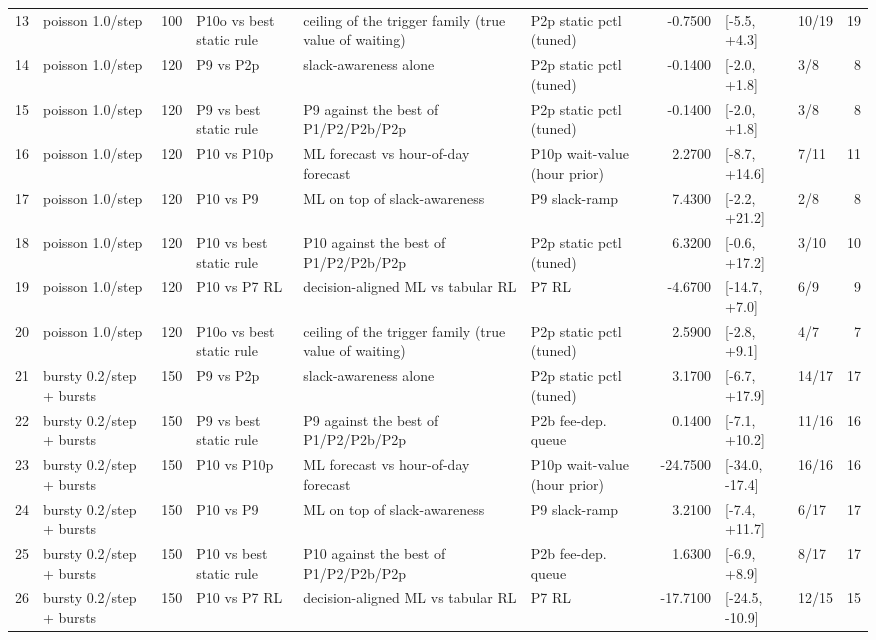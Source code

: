 \begin{tabular}{llrlllrllr}
13 & poisson 1.0/step & 100 & P10o vs best static rule & ceiling of the trigger family (true value of waiting) & P2p static pctl (tuned) & -0.7500 & [-5.5, +4.3] & 10/19 & 19 \\
14 & poisson 1.0/step & 120 & P9 vs P2p & slack-awareness alone & P2p static pctl (tuned) & -0.1400 & [-2.0, +1.8] & 3/8 & 8 \\
15 & poisson 1.0/step & 120 & P9 vs best static rule & P9 against the best of P1/P2/P2b/P2p & P2p static pctl (tuned) & -0.1400 & [-2.0, +1.8] & 3/8 & 8 \\
16 & poisson 1.0/step & 120 & P10 vs P10p & ML forecast vs hour-of-day forecast & P10p wait-value (hour prior) & 2.2700 & [-8.7, +14.6] & 7/11 & 11 \\
17 & poisson 1.0/step & 120 & P10 vs P9 & ML on top of slack-awareness & P9 slack-ramp & 7.4300 & [-2.2, +21.2] & 2/8 & 8 \\
18 & poisson 1.0/step & 120 & P10 vs best static rule & P10 against the best of P1/P2/P2b/P2p & P2p static pctl (tuned) & 6.3200 & [-0.6, +17.2] & 3/10 & 10 \\
19 & poisson 1.0/step & 120 & P10 vs P7 RL & decision-aligned ML vs tabular RL & P7 RL & -4.6700 & [-14.7, +7.0] & 6/9 & 9 \\
20 & poisson 1.0/step & 120 & P10o vs best static rule & ceiling of the trigger family (true value of waiting) & P2p static pctl (tuned) & 2.5900 & [-2.8, +9.1] & 4/7 & 7 \\
21 & bursty 0.2/step + bursts & 150 & P9 vs P2p & slack-awareness alone & P2p static pctl (tuned) & 3.1700 & [-6.7, +17.9] & 14/17 & 17 \\
22 & bursty 0.2/step + bursts & 150 & P9 vs best static rule & P9 against the best of P1/P2/P2b/P2p & P2b fee-dep. queue & 0.1400 & [-7.1, +10.2] & 11/16 & 16 \\
23 & bursty 0.2/step + bursts & 150 & P10 vs P10p & ML forecast vs hour-of-day forecast & P10p wait-value (hour prior) & -24.7500 & [-34.0, -17.4] & 16/16 & 16 \\
24 & bursty 0.2/step + bursts & 150 & P10 vs P9 & ML on top of slack-awareness & P9 slack-ramp & 3.2100 & [-7.4, +11.7] & 6/17 & 17 \\
25 & bursty 0.2/step + bursts & 150 & P10 vs best static rule & P10 against the best of P1/P2/P2b/P2p & P2b fee-dep. queue & 1.6300 & [-6.9, +8.9] & 8/17 & 17 \\
26 & bursty 0.2/step + bursts & 150 & P10 vs P7 RL & decision-aligned ML vs tabular RL & P7 RL & -17.7100 & [-24.5, -10.9] & 12/15 & 15 \\

\end{tabular}
